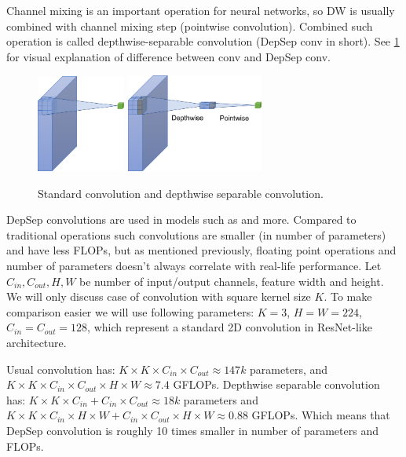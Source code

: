 Channel mixing is an important operation for neural networks, so DW is usually combined with channel mixing step (pointwise convolution). Combined such operation is called depthwise-separable convolution (DepSep conv in short). See \ref{fig: convs} for visual explanation of difference between conv and DepSep conv. 

\begin{figure}[h]
    \centering
         \includegraphics[width=0.26\textwidth]{images/conv.pdf}
         \hfil
         \includegraphics[width=0.4\textwidth]{images/conv_DepSep.pdf}
    \caption{Standard convolution and depthwise separable convolution.}   \label{fig: convs}
    \end{figure}


DepSep convolutions are used in models such as \cite{tan2019_efficientnet, howard2017_mobilenetv1} and more. Compared to traditional operations such 
convolutions are smaller (in number of parameters) and have less FLOPs, but as mentioned previously, floating point operations and number of parameters doesn't always correlate with real-life performance. Let $C_{in}, C_{out}, H, W$ be number of input/output channels, feature width and height. We will only discuss case of convolution with square kernel size $K$. To make comparison easier we will use following parameters: $K=3$, $H=W=224$, $C_{in} = C_{out}=128$, which represent a standard 2D convolution in ResNet-like architecture.  

Usual convolution has: $ K \times K \times C_{in} \times C_{out} \approx 147k$ parameters, and $ K \times K \times C_{in} \times C_{out} \times H \times W \approx 7.4 $ GFLOPs. Depthwise separable convolution has: $ K \times K \times C_{in} + C_{in} \times C_{out} \approx 18k$ parameters and $ K \times K \times C_{in} \times H \times W + C_{in} \times C_{out} \times H \times W \approx 0.88$ GFLOPs. Which means that DepSep convolution is roughly 10 times smaller in number of parameters and FLOPs. 

